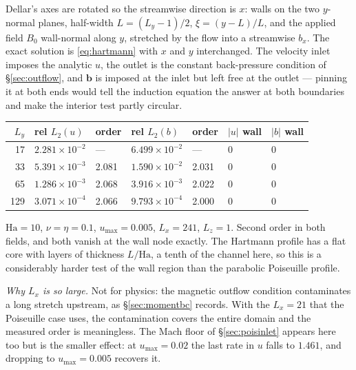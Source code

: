 \documentclass[11pt,a4paper]{article}
\newcommand{\bb}{\bm{b}}
\newcommand{\e}[1]{\times 10^{#1}}
\begin{document}
\noindent Dellar's axes are rotated so the streamwise direction is $x$: walls on
the two $y$-normal planes, half-width $L=(L_y-1)/2$, $\xi=(y-L)/L$, and the
applied field $B_0$ wall-normal along $y$, stretched by the flow into a
streamwise $b_x$. The exact solution is \eqref{eq:hartmann} with $x$ and $y$
interchanged. The velocity inlet imposes the analytic $u$, the outlet is the
constant back-pressure condition of \S\ref{sec:outflow}, and $\bb$ is imposed at
the inlet but left free at the outlet --- pinning it at both ends would tell the
induction equation the answer at both boundaries and make the interior test
partly circular.

\begin{center}\small
\begin{tabular}{rllllll}
\toprule
$L_y$ & rel $L_2(u)$ & order & rel $L_2(b)$ & order & $|u|$ wall & $|b|$ wall \\
\midrule
17  & $2.281\e{-2}$ & ---   & $6.499\e{-2}$ & ---   & $0$ & $0$ \\
33  & $5.391\e{-3}$ & 2.081 & $1.590\e{-2}$ & 2.031 & $0$ & $0$ \\
65  & $1.286\e{-3}$ & 2.068 & $3.916\e{-3}$ & 2.022 & $0$ & $0$ \\
129 & $3.071\e{-4}$ & 2.066 & $9.793\e{-4}$ & 2.000 & $0$ & $0$ \\
\bottomrule
\end{tabular}
\end{center}
\noindent $\mathrm{Ha}=10$, $\nu=\eta=0.1$, $u_{\max}=0.005$, $L_x=241$,
$L_z=1$. Second order in both fields, and both vanish at the wall node exactly.
The Hartmann profile has a flat core with layers of thickness $L/\mathrm{Ha}$, a
tenth of the channel here, so this is a considerably harder test of the wall
region than the parabolic Poiseuille profile.

\emph{Why $L_x$ is so large.} Not for physics: the magnetic outflow condition
contaminates a long stretch upstream, as \S\ref{sec:momentbc} records. With the
$L_x=21$ that the Poiseuille case uses, the contamination covers the entire
domain and the measured order is meaningless. The Mach floor of
\S\ref{sec:poisinlet} appears here too but is the smaller effect: at
$u_{\max}=0.02$ the last rate in $u$ falls to $1.461$, and dropping to
$u_{\max}=0.005$ recovers it.
\end{document}
